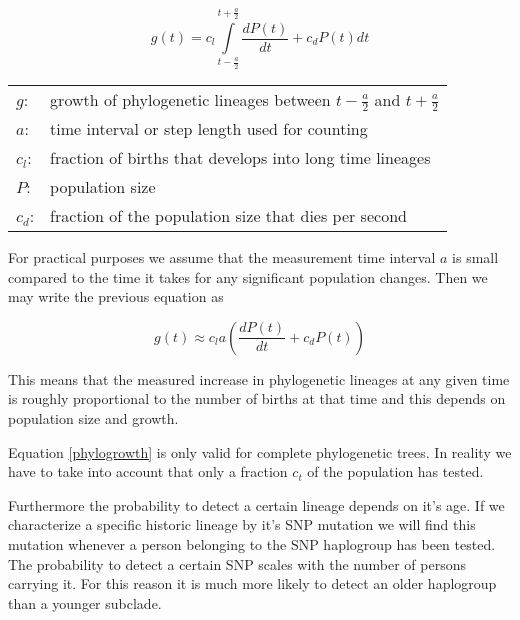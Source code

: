 \begin{equation}
g(t) = c_l \int\limits_{t-\frac{a}{2}}^{t+\frac{a}{2}} \frac{dP(t)}{dt} + c_{d} P(t) dt
\end{equation}

\begin{tabular}{ll}
$g$:     & growth of phylogenetic lineages between $t-\frac{a}{2}$ and $t+\frac{a}{2}$\\
$a$:     & time interval or step length used for counting\\
$c_l$:   & fraction of births that develops into long time lineages\\
$P$:     & population size\\
$c_{d}$: & fraction of the population size that dies per second
\end{tabular}
\vspace{1em}

For practical purposes we assume that the measurement time
interval $a$ is small compared to the time it takes for any
significant population changes. Then we may write the previous
equation as

\begin{equation}
g(t) \approx c_l a \left( \frac{dP(t)}{dt} + c_{d} P(t) \right) \label{phylogrowth}
\end{equation}

This means that the measured increase in phylogenetic lineages
at any given time is roughly proportional to the number of births
at that time and this depends on population size and growth.

Equation \ref{phylogrowth} is only valid for complete phylogenetic
trees. In reality we have to take into account that only a fraction
$c_t$ of the population has tested.

Furthermore the probability to detect a certain lineage depends
on it's age. If we characterize a specific historic lineage by
it's SNP mutation we will find this mutation whenever a person
belonging to the SNP haplogroup has been tested. The probability
to detect a certain SNP scales with the number of persons carrying
it. For this reason it is much more likely to detect an older
haplogroup than a younger subclade. 








